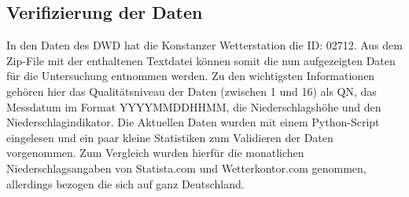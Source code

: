 \subsection{Verifizierung der Daten}
In den Daten des DWD hat die Konstanzer Wetterstation die ID: 02712. Aus dem Zip-File mit der enthaltenen Textdatei können somit die nun aufgezeigten Daten für die Untersuchung entnommen werden. Zu den wichtigsten Informationen gehören hier das Qualitätsniveau der Daten (zwischen 1 und 16) als QN, das Messdatum im Format YYYYMMDDHHMM, die Niederschlagshöhe und den Niederschlagindikator. Die Aktuellen Daten wurden mit einem Python-Script eingelesen und ein paar kleine Statistiken zum Validieren der Daten vorgenommen. Zum Vergleich wurden hierfür die monatlichen Niederschlagsangaben von Statista.com und Wetterkontor.com genommen, allerdings bezogen die sich auf ganz Deutschland.
